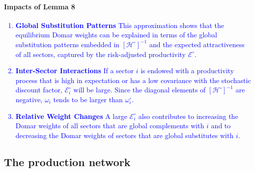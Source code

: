 \documentclass[11pt]{article}
\theoremstyle{definition}
\begin{document}
	\paragraph{Impacts of Lemma 8}
	\textcolor{blue}{\begin{enumerate}[leftmargin=1cm, label=\arabic*.]
		\item \textbf{Global Substitution Patterns} This approximation shows that the equilibrium Domar weights can be explained in terms of the global substitution patterns embedded in \( [ \mathcal{H}^\circ]^{-1} \) and the expected attractiveness of all sectors, captured by the risk-adjusted productivity \(  \mathcal{E}^\circ \).
		\item \textbf{Inter-Sector Interactions} If a sector \( i \) is endowed with a productivity process that is high in expectation or has a low covariance with the stochastic discount factor, \(  \mathcal{E}^\circ_i \) will be large. Since the diagonal elements of \( [ \mathcal{H}^\circ]^{-1} \) are negative, \( \omega_i \) tends to be larger than \( \omega^\circ_i \).
		\item \textbf{Relative Weight Changes} A large \( \mathcal{E}^\circ_i \) also contributes to increasing the Domar weights of all sectors that are global complements with \( i \) and to decreasing the Domar weights of sectors that are global substitutes with \( i \).
	\end{enumerate}}

	
	\subsection{The production network}
	


	



	
	
	
\end{document}
